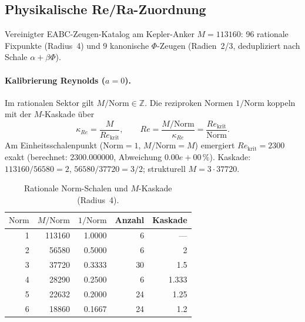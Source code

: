 \subsection{Physikalische Re/Ra-Zuordnung}\label{sec:eabc-re-ra}

Vereinigter EABC-Zeugen-Katalog am Kepler-Anker $M=113160$:
96 rationale Fixpunkte (Radius~4) und
9 kanonische $\Phi$-Zeugen (Radien~2/3, dedupliziert nach Schale $\alpha+\beta\Phi$).

\paragraph{Kalibrierung Reynolds ($a=0$).}
Im rationalen Sektor gilt $M/\mathrm{Norm}\in\mathbb{Z}$.
Die reziproken Normen $1/\mathrm{Norm}$ koppeln mit der $M$-Kaskade
über
\[
  \kappa_{Re} = \frac{M}{Re_{\mathrm{krit}}}, \qquad
  Re = \frac{M/\mathrm{Norm}}{\kappa_{Re}}
     = \frac{Re_{\mathrm{krit}}}{\mathrm{Norm}}.
\]
Am Einheitsschalenpunkt ($\mathrm{Norm}=1$, $M/\mathrm{Norm}=M$) emergiert
$Re_{\mathrm{krit}} = 2300$ exakt
(berechnet: 2300.000000, Abweichung $0.00e+00\,\%$).
Kaskade: $113160/56580=2$, $56580/37720=3/2$; strukturell $M=3\cdot 37720$.

\begin{table}[ht]
  \centering
  \caption{Rationale Norm-Schalen und $M$-Kaskade (Radius~4).}
  \label{tab:eabc-re-schalen}
  \begin{tabular}{rrrrr}
    \toprule
    $\mathrm{Norm}$ & $M/\mathrm{Norm}$ & $1/\mathrm{Norm}$ & Anzahl & Kaskade \\
    \midrule
    1 & 113160 & 1.0000 & 6 & --- \\
    2 & 56580 & 0.5000 & 6 & 2 \\
    3 & 37720 & 0.3333 & 30 & 1.5 \\
    4 & 28290 & 0.2500 & 6 & 1.333 \\
    5 & 22632 & 0.2000 & 24 & 1.25 \\
    6 & 18860 & 0.1667 & 24 & 1.2 \\
    \bottomrule
  \end{tabular}
\end{table}

